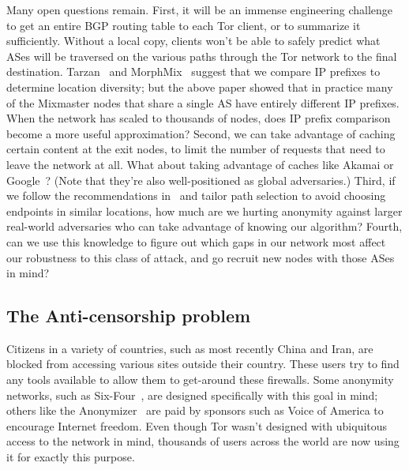 \documentclass{llncs}
\begin{document}
Many open questions remain. First, it will be an immense engineering
challenge to get an entire BGP routing table to each Tor client, or to
summarize it sufficiently. Without a local copy, clients won't be
able to safely predict what ASes will be traversed on the various paths
through the Tor network to the final destination. Tarzan~\cite{tarzan:ccs02}
and MorphMix~\cite{morphmix:fc04} suggest that we compare IP prefixes to
determine location diversity; but the above paper showed that in practice
many of the Mixmaster nodes that share a single AS have entirely different
IP prefixes. When the network has scaled to thousands of nodes, does IP
prefix comparison become a more useful approximation? %
%
Second, we can take advantage of caching certain content at the
exit nodes, to limit the number of requests that need to leave the
network at all. What about taking advantage of caches like Akamai or
Google~\cite{shsm03}? (Note that they're also well-positioned as global
adversaries.)
%
Third, if we follow the recommendations in~\cite{feamster:wpes2004}
 and tailor path selection
to avoid choosing endpoints in similar locations, how much are we hurting
anonymity against larger real-world adversaries who can take advantage
of knowing our algorithm?
%
Fourth, can we use this knowledge to figure out which gaps in our network
most affect our robustness to this class of attack, and go recruit
new nodes with those ASes in mind?


\subsection{The Anti-censorship problem}
\label{subsec:china}

Citizens in a variety of countries, such as most recently China and
Iran, are blocked from accessing various sites outside
their country. These users try to find any tools available to allow
them to get-around these firewalls. Some anonymity networks, such as
Six-Four~\cite{six-four}, are designed specifically with this goal in
mind; others like the Anonymizer~\cite{anonymizer} are paid by sponsors
such as Voice of America to encourage Internet
freedom. Even though Tor wasn't
designed with ubiquitous access to the network in mind, thousands of
users across the world are now using it for exactly this purpose.
\end{document}
